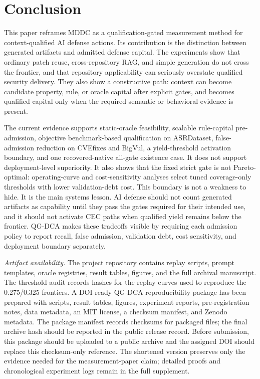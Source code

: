 ﻿\documentclass[lettersize,journal]{IEEEtran}
\begin{document}
\section{Conclusion}
This paper reframes MDDC as a qualification-gated measurement method for context-qualified AI defense actions. Its contribution is the distinction between generated artifacts and admitted defense capital. The experiments show that ordinary patch reuse, cross-repository RAG, and simple generation do not cross the frontier, and that repository applicability can seriously overstate qualified security delivery. They also show a constructive path: context can become candidate property, rule, or oracle capital after explicit gates, and becomes qualified capital only when the required semantic or behavioral evidence is present.

The current evidence supports static-oracle feasibility, scalable rule-capital pre-admission, objective benchmark-based qualification on ASRDataset, false-admission reduction on CVEfixes and BigVul, a yield-threshold activation boundary, and one recovered-native all-gate existence case. It does not support deployment-level superiority. It also shows that the fixed strict gate is not Pareto-optimal: operating-curve and cost-sensitivity analyses select tuned coverage-only thresholds with lower validation-debt cost. This boundary is not a weakness to hide. It is the main systems lesson. AI defense should not count generated artifacts as capability until they pass the gates required for their intended use, and it should not activate CEC paths when qualified yield remains below the frontier. QG-DCA makes these tradeoffs visible by requiring each admission policy to report recall, false admission, validation debt, cost sensitivity, and deployment boundary separately.

\textit{Artifact availability.} The project repository contains replay scripts, prompt templates, oracle registries, result tables, figures, and the full archival manuscript. The threshold audit records hashes for the replay curves used to reproduce the 0.275/0.325 frontiers. A DOI-ready QG-DCA reproducibility package has been prepared with scripts, result tables, figures, experiment reports, pre-registration notes, data metadata, an MIT license, a checksum manifest, and Zenodo metadata. The package manifest records checksums for packaged files; the final archive hash should be reported in the public release record. Before submission, this package should be uploaded to a public archive and the assigned DOI should replace this checksum-only reference. The shortened version preserves only the evidence needed for the measurement-paper claim; detailed proofs and chronological experiment logs remain in the full supplement.
\end{document}
